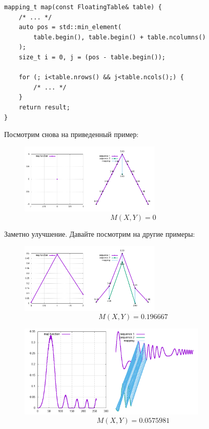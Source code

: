\documentclass[12pt]{article}
\begin{document}
\newpage

    \begin{lstlisting}
mapping_t map(const FloatingTable& table) {
    /* ... */
    auto pos = std::min_element(
        table.begin(), table.begin() + table.ncolumns()
    );
    size_t i = 0, j = (pos - table.begin());

    for (; i<table.nrows() && j<table.ncols();) {
        /* ... */
    }
    return result;
}
    \end{lstlisting}

    Посмотрим снова на приведенный пример:

    \begin{figure}[h]
        \centering
        \includegraphics[scale=1.2, width=0.6\textwidth, height=0.3\textwidth]{solve3}
        $$M(X, Y) = 0$$
    \end{figure}

    Заметно улучшение. Давайте посмотрим на другие примеры:

    \begin{figure}[h]
        \centering
        \includegraphics[scale=1.2, width=0.6\textwidth, height=0.3\textwidth]{new_unequal}
        $$M(X, Y) = 0.196667$$
    \end{figure}

    \newpage
    \begin{figure}[h]
        \centering
        \includegraphics[scale=1.2, width=0.8\textwidth, height=0.4\textwidth]{cont3}
        $$M(X, Y) = 0.0575981$$
    \end{figure}
\end{document}
